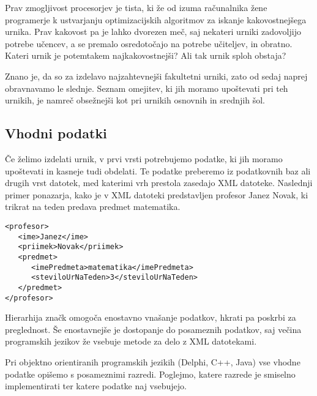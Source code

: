 \documentclass[10pt, a4paper]{article}
\begin{document}
Prav zmogljivost procesorjev je tista, ki že od izuma računalnika žene programerje k
ustvarjanju optimizacijskih algoritmov za iskanje kakovostnejšega urnika. Prav kakovost
pa je lahko dvorezen meč, saj nekateri urniki zadovoljijo potrebe učencev, a se premalo
osredotočajo na potrebe učiteljev, in obratno. Kateri urnik je potemtakem najkakovostnejši?
Ali tak urnik sploh obstaja?

Znano je, da so za izdelavo najzahtevnejši fakultetni urniki, zato od sedaj naprej
obravnavamo le slednje. Seznam omejitev, ki jih moramo upoštevati pri teh urnikih,
je namreč obsežnejši kot pri urnikih osnovnih in srednjih šol.

\subsection{Vhodni podatki}

Če želimo izdelati urnik, v prvi vrsti potrebujemo podatke, ki jih moramo upoštevati in
kasneje tudi obdelati. Te podatke preberemo iz podatkovnih baz ali drugih vrst datotek,
med katerimi vrh prestola zasedajo XML datoteke. Naslednji primer ponazarja, kako je v
XML datoteki predstavljen profesor Janez Novak, ki trikrat na teden predava predmet
matematika.


\begin{verbatim}
<profesor>
   <ime>Janez</ime>
   <priimek>Novak</priimek>
   <predmet>
      <imePredmeta>matematika</imePredmeta>
      <steviloUrNaTeden>3</steviloUrNaTeden>
   </predmet>
</profesor>
\end{verbatim}

\noindent Hierarhija značk omogoča enostavno vnašanje podatkov, hkrati pa poskrbi za preglednost.
Še enostavnejše je dostopanje do posameznih podatkov, saj večina programskih jezikov že
vsebuje metode za delo z XML datotekami.

Pri objektno orientiranih programskih jezikih (Delphi, C++, Java) vse vhodne podatke
opišemo s posameznimi razredi. Poglejmo, katere razrede je smiselno implementirati ter
katere podatke naj vsebujejo.
\end{document}
